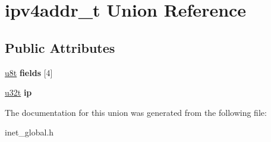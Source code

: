 \hypertarget{unionipv4addr__t}{}\section{ipv4addr\+\_\+t Union Reference}
\label{unionipv4addr__t}
\subsection*{Public Attributes}
\begin{DoxyCompactItemize}
\item 
\mbox{\label{unionipv4addr__t_ad433218e640ad7a4cfa6382a4edc026d}} 
\hyperlink{macros_8h_a176a4ab0531a048e0693a4520c550193}{u8t} {\bfseries fields} \mbox{[}4\mbox{]}
\item 
\mbox{\label{unionipv4addr__t_a7ad3271285fde5de3a499b380f668851}} 
\hyperlink{macros_8h_a464a07ed2c6d005d677113cc44750a64}{u32t} {\bfseries ip}
\end{DoxyCompactItemize}


The documentation for this union was generated from the following file\+:\begin{DoxyCompactItemize}
\item 
inet\+\_\+global.\+h\end{DoxyCompactItemize}
